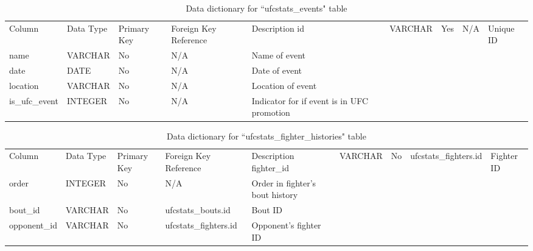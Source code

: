\documentclass[12pt,twoside]{report}
\begin{document}
\newpage 
\tiny 
\begin{longtable}{lllll}
\caption{Data dictionary for ``ufcstats\_events" table}\\ 
\toprule
Column         & Data Type & Primary Key & Foreign Key Reference & Description                                 \endfirsthead 
\toprule
id             & VARCHAR   & Yes         & N/A                   & Unique ID                                   \\
name           & VARCHAR   & No          & N/A                   & Name of event                               \\
date           & DATE      & No          & N/A                   & Date of event                               \\
location       & VARCHAR   & No          & N/A                   & Location of event                           \\
is\_ufc\_event & INTEGER   & No          & N/A                   & Indicator for if event is in UFC promotion  \\
\bottomrule
\end{longtable}
\normalsize

\tiny 
\begin{longtable}{lllll}
\caption{Data dictionary for ``ufcstats\_fighter\_histories" table}\\ 
\toprule
Column       & Data Type & Primary Key & Foreign Key Reference & Description                       \endfirsthead 
\toprule
fighter\_id  & VARCHAR   & No          & ufcstats\_fighters.id & Fighter ID                        \\
order        & INTEGER   & No          & N/A                   & Order in fighter's bout history~  \\
bout\_id     & VARCHAR   & No          & ufcstats\_bouts.id    & Bout ID                           \\
opponent\_id & VARCHAR   & No          & ufcstats\_fighters.id & Opponent's fighter ID             \\
\bottomrule
\end{longtable}
\normalsize
\end{document}
